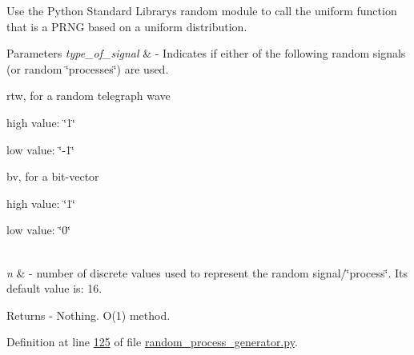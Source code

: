 Use the Python Standard Library\textquotesingle{}s random module to call the uniform function that is a P\+R\+N\+G based on a uniform distribution.


\begin{DoxyParams}{Parameters}
{\em type\+\_\+of\+\_\+signal} & -\/ Indicates if either of the following random signals (or random \char`\"{}processes\char`\"{}) are used.
\begin{DoxyItemize}
\item rtw, for a random telegraph wave
\begin{DoxyItemize}
\item high value\+: \char`\"{}1\char`\"{}
\item low value\+: \char`\"{}-\/1\char`\"{}
\end{DoxyItemize}
\item bv, for a bit-\/vector
\begin{DoxyItemize}
\item high value\+: \char`\"{}1\char`\"{}
\item low value\+: \char`\"{}0\char`\"{} 
\end{DoxyItemize}
\end{DoxyItemize}\\
\hline
{\em n} & -\/ number of discrete values used to represent the random signal/\char`\"{}process\char`\"{}. Its default value is\+: 16. \\
\hline
\end{DoxyParams}
\begin{DoxyReturn}{Returns}
-\/ Nothing. O(1) method. 
\end{DoxyReturn}


Definition at line \hyperlink{random__process__generator_8py_source_l00125}{125} of file \hyperlink{random__process__generator_8py_source}{random\+\_\+process\+\_\+generator.\+py}.


